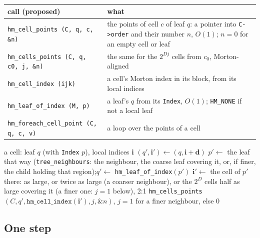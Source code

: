 \documentclass[10pt,a4paper]{article}
\theoremstyle{definition}
\newcommand{\fn}[1]{\texttt{#1}}
\begin{document}
\begin{center}
\small
\begin{tabularx}{\textwidth}{@{}>{\raggedright}p{}X@{}}
  \toprule
  call (proposed) & what \\
  \midrule
  \fn{hm\_cell\_points (C, q, c, \&n)} & the points of cell $c$ of leaf $q$:
    a pointer into \fn{C->order} and their number $n$, $O(1)$; $n = 0$ for
    an empty cell or leaf \\
  \fn{hm\_cells\_points (C, q, c0, j, \&n)} & the same for the $2^{D j}$
    cells from $c_0$, Morton-aligned \\
  \fn{hm\_cell\_index (ijk)} & a cell's Morton index in its block, from its
    local indices \\
  \fn{hm\_leaf\_of\_index (M, p)} & a leaf's $q$ from its \fn{Index}, $O(1)$;
    \fn{HM\_NONE} if not a local leaf \\
  \fn{hm\_foreach\_cell\_point (C, q, c, v)} & a loop over the points of a
    cell \\
  \bottomrule
\end{tabularx}
\end{center}

\begin{algorithm}[H]
  \caption{The points around a cell, $O(1)$ a cell}
  \label{alg:nbhd}
  \begin{algorithmic}[1]
    \Require a cell: leaf $q$ (with \fn{Index} $p$), local indices
      $\mathbf{i}$
        \State $(q', \mathbf{i}') \gets (q, \mathbf{i} + \mathbf{d})$
      \Else {}
        \State $p' \gets$ the leaf that way (\fn{tree\_neighbours}: the
          neighbour, the coarse leaf covering it, or, if finer, the child
          holding that region);\quad $q' \gets$
          \fn{hm\_leaf\_of\_index}$(p')$
        \State $\mathbf{i}' \gets$ the cell of $p'$ there: as large, or
          twice as large (a coarser neighbour), or the $2^D$ cells half as
          large covering it (a finer one: $j = 1$ below), 2:1
      \EndIf
      \State \fn{hm\_cells\_points}$(C, q', \fn{hm\_cell\_index}(\mathbf{i}'),
        j, \&n)$, $j = 1$ for a finer neighbour, else 0 
    \EndFor
  \end{algorithmic}
\end{algorithm}

\subsection{One step}
\label{sec:part-step}
\end{document}
